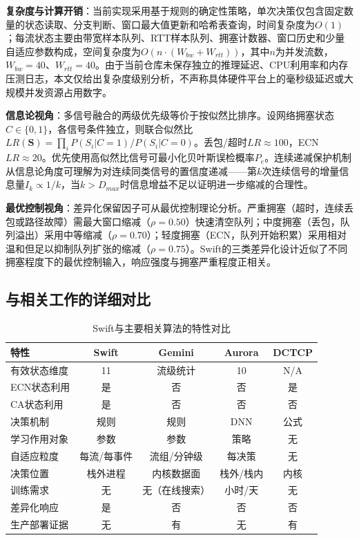 \documentclass[10pt,twocolumn]{article}
\begin{document}
\textbf{复杂度与计算开销}：当前实现采用基于规则的确定性策略，单次决策仅包含固定数量的状态读取、分支判断、窗口最大值更新和哈希表查询，时间复杂度为$O(1)$；每流状态主要由带宽样本队列、RTT样本队列、拥塞计数器、窗口历史和少量自适应参数构成，空间复杂度为$O(n\cdot (W_{bw}+W_{rtt}))$，其中$n$为并发流数，$W_{bw}=40$、$W_{rtt}=40$。由于当前仓库未保存独立的推理延迟、CPU利用率和内存压测日志，本文仅给出复杂度级别分析，不声称具体硬件平台上的毫秒级延迟或大规模并发资源占用数字。

\textbf{信息论视角}：多信号融合的两级优先级等价于按似然比排序。设网络拥塞状态$C \in \{0,1\}$，各信号条件独立，则联合似然比$LR(\mathbf{S}) = \prod_i P(S_i|C=1)/P(S_i|C=0)$。丢包/超时$LR \approx 100$，ECN $LR \approx 20$。优先使用高似然比信号可最小化贝叶斯误检概率$P_e$。连续递减保护机制从信息论角度可理解为对连续同类信号的置信度递减——第$k$次连续信号的增量信息量$I_k \propto 1/k$，当$k > D_{max}$时信息增益不足以证明进一步缩减的合理性。

\textbf{最优控制视角}：差异化保留因子可从最优控制理论分析。严重拥塞（超时，连续丢包或路径故障）需最大窗口缩减（$\rho=0.50$）快速清空队列；中度拥塞（丢包，队列溢出）采用中等缩减（$\rho=0.70$）；轻度拥塞（ECN，队列开始积累）采用相对温和但足以抑制队列扩张的缩减（$\rho=0.75$）。Swift的三类差异化设计近似了不同拥塞程度下的最优控制输入，响应强度与拥塞严重程度正相关。

\subsection{与相关工作的详细对比}

\begin{table}[htbp]
\centering
\caption{Swift与主要相关算法的特性对比}
\label{tab:comparison}
\footnotesize
\setlength{\tabcolsep}{2.5pt}
\begin{tabular}{@{}lcccc@{}}
\toprule
\textbf{特性} & \textbf{Swift} & \textbf{Gemini} & \textbf{Aurora} & \textbf{DCTCP} \\
\midrule
有效状态维度 & 11 & 流级统计 & 10 & N/A \\
ECN状态利用 & 是 & 否 & 否 & 是 \\
CA状态利用 & 是 & 否 & 否 & 否 \\
决策机制 & 规则 & 规则 & DNN & 公式 \\
学习作用对象 & 参数 & 参数 & 策略 & 无 \\
自适应粒度 & 每流/每事件 & 流组/分钟级 & 每决策 & 无 \\
决策位置 & 栈外进程 & 内核数据面 & 栈外/栈内 & 内核 \\
训练需求 & 无 & 无（在线搜索） & 小时/天 & 无 \\
差异化响应 & 是 & 否 & 否 & 否 \\
生产部署证据 & 无 & 有 & 无 & 有 \\
\bottomrule
\end{tabular}
\end{table}
\end{document}
